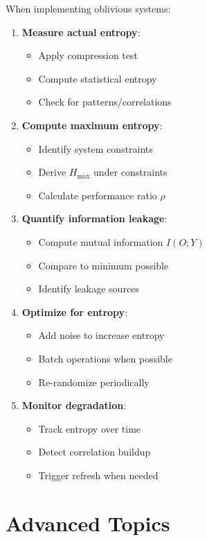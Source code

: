 \documentclass[11pt,final]{article}
\begin{document}
When implementing oblivious systems:
\begin{enumerate}
    \item \textbf{Measure actual entropy}: 
        \begin{itemize}
            \item Apply compression test
            \item Compute statistical entropy
            \item Check for patterns/correlations
        \end{itemize}
    \item \textbf{Compute maximum entropy}:
        \begin{itemize}
            \item Identify system constraints
            \item Derive $H_{\max}$ under constraints
            \item Calculate performance ratio $\rho$
        \end{itemize}
    \item \textbf{Quantify information leakage}:
        \begin{itemize}
            \item Compute mutual information $I(O; Y)$
            \item Compare to minimum possible
            \item Identify leakage sources
        \end{itemize}
    \item \textbf{Optimize for entropy}:
        \begin{itemize}
            \item Add noise to increase entropy
            \item Batch operations when possible
            \item Re-randomize periodically
        \end{itemize}
    \item \textbf{Monitor degradation}:
        \begin{itemize}
            \item Track entropy over time
            \item Detect correlation buildup
            \item Trigger refresh when needed
        \end{itemize}
\end{enumerate}

\section{Advanced Topics}
\end{document}
